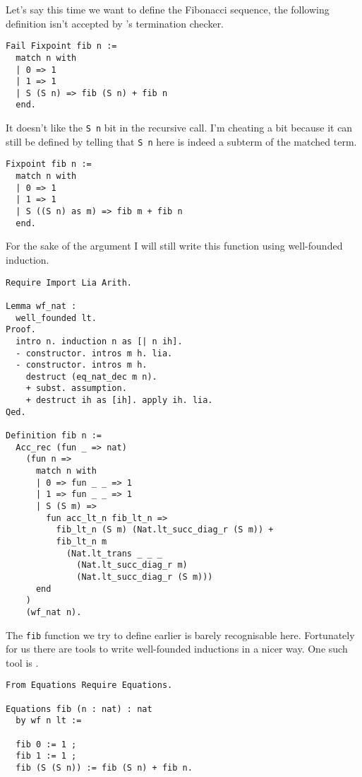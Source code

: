 Let's say this time we want to define the Fibonacci sequence, the following
definition isn't accepted by \Coq's termination checker.
\begin{verbatim}
Fail Fixpoint fib n :=
  match n with
  | 0 => 1
  | 1 => 1
  | S (S n) => fib (S n) + fib n
  end.
\end{verbatim}
It doesn't like the \texttt{S n} bit in the recursive call.
I'm cheating a bit because it can still be defined by telling \Coq that
\texttt{S n} here is indeed a subterm of the matched term.
\begin{verbatim}
Fixpoint fib n :=
  match n with
  | 0 => 1
  | 1 => 1
  | S ((S n) as m) => fib m + fib n
  end.
\end{verbatim}
For the sake of the argument I will still write this function using well-founded
induction.
\begin{verbatim}
Require Import Lia Arith.

Lemma wf_nat :
  well_founded lt.
Proof.
  intro n. induction n as [| n ih].
  - constructor. intros m h. lia.
  - constructor. intros m h.
    destruct (eq_nat_dec m n).
    + subst. assumption.
    + destruct ih as [ih]. apply ih. lia.
Qed.

Definition fib n :=
  Acc_rec (fun _ => nat)
    (fun n =>
      match n with
      | 0 => fun _ _ => 1
      | 1 => fun _ _ => 1
      | S (S m) =>
        fun acc_lt_n fib_lt_n =>
          fib_lt_n (S m) (Nat.lt_succ_diag_r (S m)) +
          fib_lt_n m
            (Nat.lt_trans _ _ _
              (Nat.lt_succ_diag_r m)
              (Nat.lt_succ_diag_r (S m)))
      end
    )
    (wf_nat n).
\end{verbatim}
The \texttt{fib} function we try to define earlier is barely
recognisable here. Fortunately for us there are tools to write well-founded
inductions in a nicer way. One such tool is \Equations.
\begin{verbatim}
From Equations Require Equations.

Equations fib (n : nat) : nat
  by wf n lt :=

  fib 0 := 1 ;
  fib 1 := 1 ;
  fib (S (S n)) := fib (S n) + fib n.
\end{verbatim}
